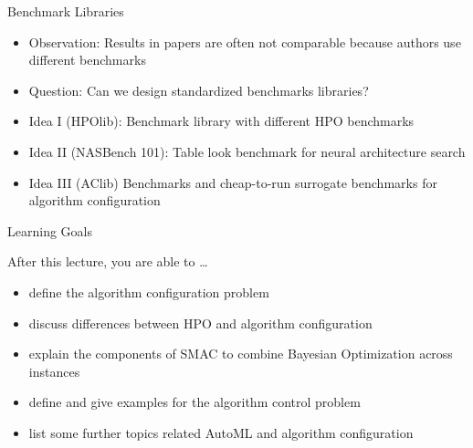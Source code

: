 \begin{frame}[c]{Benchmark Libraries}

\begin{itemize}
	\item \alert{Observation}: Results in papers are often not comparable because authors use different benchmarks
	\smallskip
	\pause
	\item \alert{Question}: Can we design standardized benchmarks libraries?
	\smallskip
	\pause
	\item \alert{Idea I (HPOlib)}: Benchmark library with different HPO benchmarks
	\smallskip
	\pause
	\item \alert{Idea II (NASBench 101)}: Table look benchmark for neural architecture search
	\smallskip
	\pause
	\item  \alert{Idea III (AClib)} Benchmarks and cheap-to-run surrogate benchmarks for algorithm configuration
\end{itemize}

\end{frame}

\begin{frame}[c]{Learning Goals}

After this lecture, you are able to \ldots

\begin{itemize}
	\item define the \alert{algorithm configuration problem}
	\item discuss \alert{differences} between HPO and algorithm configuration
	\item explain the \alert{components of SMAC} to combine Bayesian Optimization across instances
	\item define and give examples for the \alert{algorithm control problem}
	\item list some \alert{further topics} related AutoML and algorithm configuration
\end{itemize}

\end{frame}

